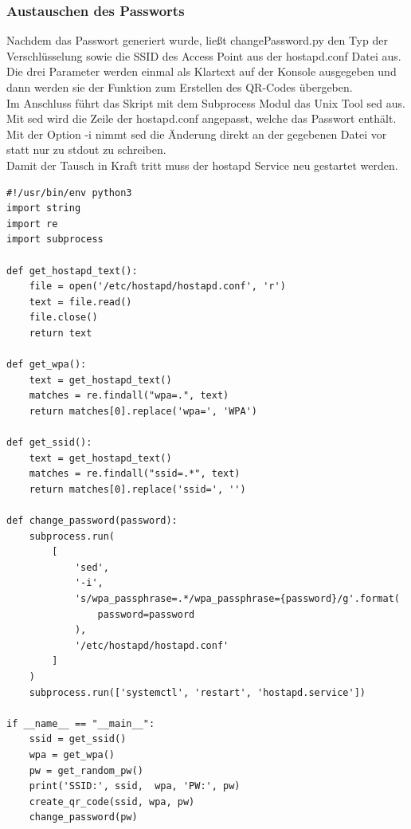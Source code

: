 \documentclass[a4paper,11pt,singlespacing]{article}
\begin{document}
    	\subsubsection{Austauschen des Passworts}
    		Nachdem das Passwort generiert wurde, ließt changePassword.py den Typ der Verschlüsselung sowie die SSID des Access Point aus der hostapd.conf Datei aus. Die drei Parameter werden einmal als Klartext auf der Konsole ausgegeben und dann werden sie der Funktion zum Erstellen des QR-Codes übergeben. \\
    		Im Anschluss führt das Skript mit dem Subprocess Modul das Unix Tool sed aus. Mit sed wird die Zeile der hostapd.conf angepasst, welche das Passwort enthält. Mit der Option -i nimmt sed die Änderung direkt an der gegebenen Datei vor statt nur zu stdout zu schreiben. \\
    		Damit der Tausch in Kraft tritt muss der hostapd Service neu gestartet werden. \\ 
   

\begin{lstlisting}
#!/usr/bin/env python3
import string
import re
import subprocess	

def get_hostapd_text():
    file = open('/etc/hostapd/hostapd.conf', 'r')
    text = file.read()
    file.close()
    return text

def get_wpa():
    text = get_hostapd_text()
    matches = re.findall("wpa=.", text)
    return matches[0].replace('wpa=', 'WPA')

def get_ssid():
    text = get_hostapd_text()
    matches = re.findall("ssid=.*", text)
    return matches[0].replace('ssid=', '')
    
def change_password(password):
    subprocess.run(
        [
            'sed',
            '-i',
            's/wpa_passphrase=.*/wpa_passphrase={password}/g'.format(
                password=password
            ),
            '/etc/hostapd/hostapd.conf'
        ]
    )
    subprocess.run(['systemctl', 'restart', 'hostapd.service'])
    
if __name__ == "__main__":
    ssid = get_ssid()
    wpa = get_wpa()
    pw = get_random_pw()
    print('SSID:', ssid,  wpa, 'PW:', pw)
    create_qr_code(ssid, wpa, pw)
    change_password(pw)

\end{lstlisting}
    	
\end{document}
